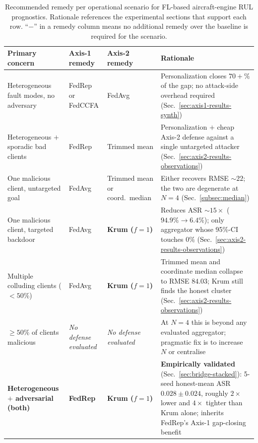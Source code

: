 \documentclass[preprint,12pt,authoryear]{elsarticle}
\begin{document}
\begin{table}[!ht]
\centering
\footnotesize
\setlength{\tabcolsep}{4pt}
\renewcommand{\arraystretch}{1.25}
\caption{Recommended remedy per operational scenario for FL-based
aircraft-engine RUL prognostics. Rationale references the experimental
sections that support each row. ``$-$'' in a remedy column means no
additional remedy over the baseline is required for the scenario.}
\label{tab:guidance}
\begin{tabular}{@{}>{\raggedright\arraybackslash}p{4.1cm} >{\raggedright\arraybackslash}p{2.7cm} >{\raggedright\arraybackslash}p{2.7cm} >{\raggedright\arraybackslash}p{4.3cm}@{}}
\toprule
Primary concern & Axis-1 remedy & Axis-2 remedy & Rationale \\
\midrule
Heterogeneous fault modes, no adversary       & FedRep or FedCCFA          & FedAvg                             & Personalization closes $70+\%$ of the gap; no attack-side overhead required (Sec.~\ref{sec:axis1-results-synth}) \\
Heterogeneous $+$ sporadic bad clients        & FedRep                     & Trimmed mean                       & Personalization $+$ cheap Axis-2 defense against a single untargeted attacker (Sec.~\ref{sec:axis2-results-observations}) \\
One malicious client, untargeted goal         & FedAvg                     & Trimmed mean or coord.\ median     & Either recovers RMSE $\sim 22$; the two are degenerate at $N = 4$ (Sec.~\ref{subsec:median}) \\
One malicious client, targeted backdoor       & FedAvg                     & \textbf{Krum ($f = 1$)}            & Reduces ASR $\sim 15\times$ ($94.9\% \to 6.4\%$); only aggregator whose 95\%-CI touches $0\%$ (Sec.~\ref{sec:axis2-results-observations}) \\
Multiple colluding clients ($< 50\%$)         & FedAvg                     & \textbf{Krum ($f = 1$)}            & Trimmed mean and coordinate median collapse to RMSE $84.03$; Krum still finds the honest cluster (Sec.~\ref{sec:axis2-results-observations}) \\
$\geq 50\%$ of clients malicious              & \emph{No defense evaluated} & \emph{No defense evaluated}        & At $N = 4$ this is beyond any evaluated aggregator; pragmatic fix is to increase $N$ or centralise \\
\midrule
\textbf{Heterogeneous $+$ adversarial (both)} & \textbf{FedRep}            & \textbf{Krum ($f = 1$)}            & \textbf{Empirically validated} (Sec.~\ref{sec:bridge-stacked}): 5-seed honest-mean ASR $0.028 \pm 0.024$, roughly $2\times$ lower and $4\times$ tighter than Krum alone; inherits FedRep's Axis-1 gap-closing benefit \\
\bottomrule
\end{tabular}
\end{table}
\end{document}

